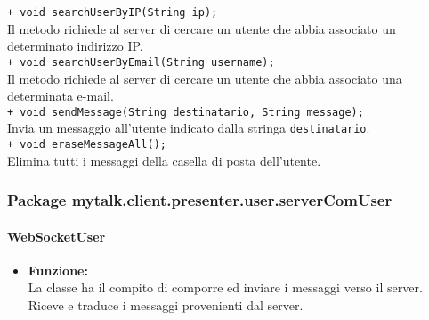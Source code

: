 {{\begin{sloppypar}
{{\begin{itemize}
{					\texttt{+ void searchUserByIP(String ip);}\\
					Il metodo richiede al server di cercare un utente che abbia associato un determinato indirizzo IP\g.\\

					\texttt{+ void searchUserByEmail(String username);}\\
					Il metodo richiede al server di cercare un utente che abbia associato una determinata e-mail.\\
					
					\texttt{+ void sendMessage(String destinatario, String message);}\\
					Invia un messaggio all'utente indicato dalla stringa \texttt{destinatario}.\\
					 
					\texttt{+ void eraseMessageAll();}\\
					Elimina tutti i messaggi della casella di posta dell'utente.\\	
				}
			\end{itemize}
			}
		}
		
	\subsubsection{Package mytalk.client.presenter.user.serverComUser}{

		\paragraph{WebSocketUser}\label{par:WebSocketUser}{
			\begin{itemize}
				\item[] \textbf{Funzione:}\\
					La classe ha il compito di comporre ed inviare i messaggi verso il server\g. Riceve e traduce i messaggi provenienti dal server\g.\\
			

\end{itemize}}}
\end{sloppypar}}}
